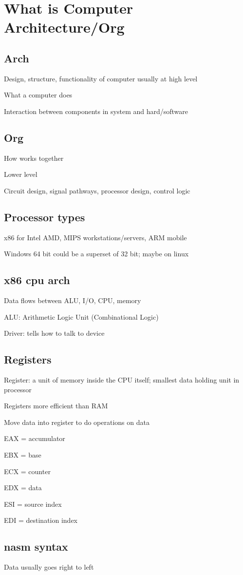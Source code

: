\documentclass[fleqn]{article}
\begin{document}
\setlength{\mathindent}{0pt}
\section*{What is Computer Architecture/Org}
\subsection*{Arch}
Design, structure, functionality of computer usually at high level

What a computer does

Interaction between components in system and hard/software
\subsection*{Org}
How works together

Lower level

Circuit design, signal pathways, processor design, control logic

\subsection*{Processor types}
x86 for Intel AMD, MIPS workstations/servers, ARM mobile

Windows 64 bit could be a superset of 32 bit; maybe on linux

\subsection*{x86 cpu arch}
Data flows between ALU, I/O, CPU, memory

ALU: Arithmetic Logic Unit (Combinational Logic)


Driver: tells how to talk to device

\subsection*{Registers}
Register: a unit of memory inside the CPU itself; smallest data holding unit in processor

Registers more efficient than RAM

Move data into register to do operations on data

EAX = accumulator

EBX = base

ECX = counter

EDX = data

ESI = source index

EDI = destination index

\subsection*{nasm syntax}
Data usually goes right to left
\end{document}
